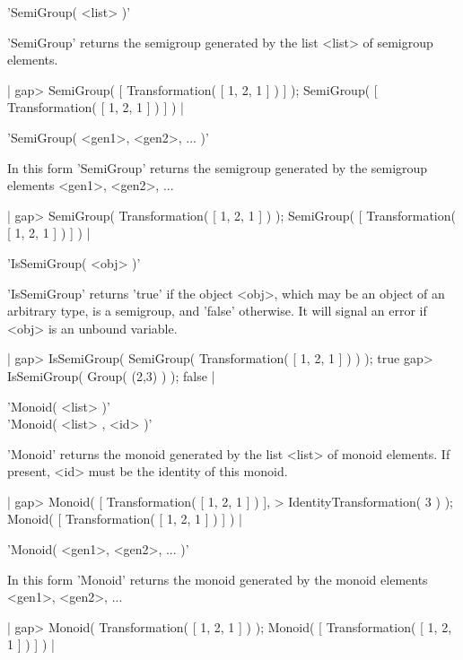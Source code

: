 
'SemiGroup( <list> )'

'SemiGroup' returns  the semigroup   generated   by the list  <list>   of
semigroup elements.

|    gap> SemiGroup( [ Transformation( [ 1, 2, 1 ] ) ] );
    SemiGroup( [ Transformation( [ 1, 2, 1 ] ) ] ) |

\vspace{5mm}
'SemiGroup( <gen1>, <gen2>, ... )'

In this form 'SemiGroup' returns the   semigroup generated by the  semigroup  elements
<gen1>, <gen2>, ...

|    gap> SemiGroup( Transformation( [ 1, 2, 1 ] ) );                     
    SemiGroup( [ Transformation( [ 1, 2, 1 ] ) ] ) |

%

'IsSemiGroup( <obj> )'

'IsSemiGroup' returns 'true' if the object <obj>,  which may be an object
of an  arbitrary  type, is a semigroup,  and  'false' otherwise.  It will
signal an error if <obj> is an unbound variable.

|    gap> IsSemiGroup( SemiGroup( Transformation( [ 1, 2, 1 ] ) ) );
    true
    gap> IsSemiGroup( Group( (2,3) ) ); 
    false |


'Monoid( <list> )'\\
'Monoid( <list> , <id> )'

'Monoid'  returns  the monoid generated  by  the  list <list>  of  monoid
elements.  If present, <id> must be the identity of this monoid.

|    gap> Monoid( [ Transformation( [ 1, 2, 1 ] ) ], 
    > IdentityTransformation( 3 ) );
    Monoid( [ Transformation( [ 1, 2, 1 ] ) ] ) |

\vspace{5mm}
'Monoid( <gen1>, <gen2>, ... )'

In this form 'Monoid' returns the monoid generated by the monoid elements
<gen1>, <gen2>, ...

|    gap> Monoid( Transformation( [ 1, 2, 1 ] ) );                     
    Monoid( [ Transformation( [ 1, 2, 1 ] ) ] ) |

